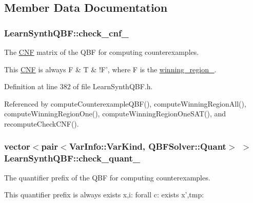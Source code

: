 \subsection{Member Data Documentation}
\hypertarget{classLearnSynthQBF_afe20b32b1b8c07a237322825c91a36f0}{
\subsubsection[{check\-\_\-cnf\-\_\-}]{ Learn\-Synth\-Q\-B\-F\-::check\-\_\-cnf\-\_\-\hspace{0.3cm}{\ttfamily [protected]}}}\label{classLearnSynthQBF_afe20b32b1b8c07a237322825c91a36f0}


The \hyperlink{classCNF}{C\-N\-F} matrix of the Q\-B\-F for computing counterexamples. 

This \hyperlink{classCNF}{C\-N\-F} is always F \& T \& !\-F', where F is the \hyperlink{classLearnSynthQBF_a9c6b41f7df5f4ed4bfc5930136fc1152}{winning\-\_\-region\-\_\-}. 

Definition at line 382 of file Learn\-Synth\-Q\-B\-F.\-h.



Referenced by compute\-Counterexample\-Q\-B\-F(), compute\-Winning\-Region\-All(), compute\-Winning\-Region\-One(), compute\-Winning\-Region\-One\-S\-A\-T(), and recompute\-Check\-C\-N\-F().

\hypertarget{classLearnSynthQBF_afafe15fef745bb97ac36741cbe00d4c1}{
\subsubsection[{check\-\_\-quant\-\_\-}]{\setlength{\rightskip}{0pt plus 5cm}vector$<$pair$<${\bf Var\-Info\-::\-Var\-Kind}, {\bf Q\-B\-F\-Solver\-::\-Quant}$>$ $>$ Learn\-Synth\-Q\-B\-F\-::check\-\_\-quant\-\_\-\hspace{0.3cm}{\ttfamily [protected]}}}\label{classLearnSynthQBF_afafe15fef745bb97ac36741cbe00d4c1}


The quantifier prefix of the Q\-B\-F for computing counterexamples. 

This quantifier prefix is always exists x,i\-: forall c\-: exists x',tmp\-: 

